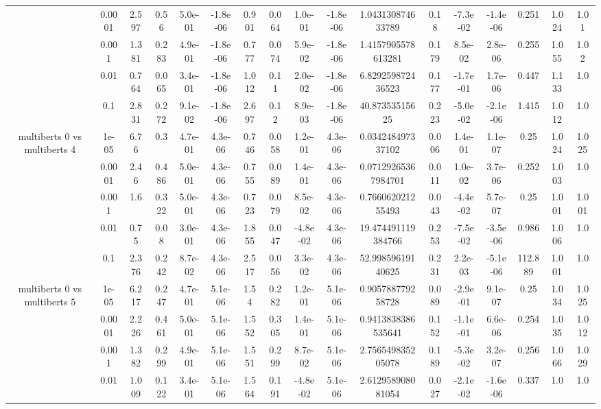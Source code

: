 \begin{tabular}{|c|c|c|c|c|c|c|c|c|c|c|c|c|c|c|c|c|}
 & 0.0001 & 2.597 & 0.56 & 5.0e-01 & -1.8e-06 & 0.901 & 0.064 & 1.0e-01 & -1.8e-06 & 1.043130874633789 & 0.18 & -7.3e-02 & -1.4e-06 & 0.251 & 1.024 & 1.01 \\
 & 0.001 & 1.381 & 0.283 & 4.9e-01 & -1.8e-06 & 0.777 & 0.074 & 5.9e-02 & -1.8e-06 & 1.4157905578613281 & 0.179 & 8.5e-02 & 2.8e-06 & 0.255 & 1.055 & 1.02 \\
 & 0.01 & 0.764 & 0.065 & 3.4e-01 & -1.8e-06 & 1.012 & 0.11 & 2.0e-02 & -1.8e-06 & 6.829259872436523 & 0.177 & -1.7e-01 & 1.7e-06 & 0.447 & 1.133 & 1.0 \\
 & 0.1 & 2.831 & 0.272 & 9.1e-02 & -1.8e-06 & 2.697 & 0.12 & 8.9e-03 & -1.8e-06 & 40.87353515625 & 0.223 & -5.0e-02 & -2.1e-06 & 1.415 & 1.012 & 1.0 \\
\hline
\multirow{5}{*}{multiberts 0 vs multiberts 4} & 1e-05 & 6.76 & 0.3 & 4.7e-01 & 4.3e-06 & 0.746 & 0.058 & 1.2e-01 & 4.3e-06 & 0.034248497337102 & 0.006 & 1.4e-01 & 1.1e-07 & 0.25 & 1.024 & 1.025 \\
 & 0.0001 & 2.46 & 0.486 & 5.0e-01 & 4.3e-06 & 0.755 & 0.089 & 1.4e-01 & 4.3e-06 & 0.07129265367984701 & 0.011 & 1.0e-02 & 3.7e-06 & 0.252 & 1.003 & 1.0 \\
 & 0.001 & 1.6 & 0.322 & 5.0e-01 & 4.3e-06 & 0.723 & 0.079 & 8.5e-02 & 4.3e-06 & 0.766062021255493 & 0.043 & -4.4e-02 & 5.7e-07 & 0.25 & 1.001 & 1.001 \\
 & 0.01 & 0.75 & 0.08 & 3.0e-01 & 4.3e-06 & 1.855 & 0.047 & -4.8e-02 & 4.3e-06 & 19.474491119384766 & 0.253 & -7.5e-02 & -3.5e-06 & 0.986 & 1.006 & 1.0 \\
 & 0.1 & 2.376 & 0.242 & 8.7e-02 & 4.3e-06 & 2.517 & 0.056 & 3.3e-02 & 4.3e-06 & 52.99859619140625 & 0.231 & 2.2e-03 & -5.1e-06 & 112.889 & 1.001 & 1.0 \\
\hline
\multirow{5}{*}{multiberts 0 vs multiberts 5} & 1e-05 & 6.217 & 0.247 & 4.7e-01 & 5.1e-06 & 1.54 & 0.282 & 1.2e-01 & 5.1e-06 & 0.905788779258728 & 0.089 & -2.9e-01 & 9.1e-07 & 0.25 & 1.034 & 1.025 \\
 & 0.0001 & 2.226 & 0.461 & 5.0e-01 & 5.1e-06 & 1.552 & 0.305 & 1.4e-01 & 5.1e-06 & 0.9413838386535641 & 0.152 & -1.1e-01 & 6.6e-06 & 0.254 & 1.035 & 1.012 \\
 & 0.001 & 1.382 & 0.299 & 4.9e-01 & 5.1e-06 & 1.551 & 0.299 & 8.7e-02 & 5.1e-06 & 2.756549835205078 & 0.189 & -5.3e-02 & 3.2e-07 & 0.256 & 1.066 & 1.029 \\
 & 0.01 & 1.009 & 0.122 & 3.4e-01 & 5.1e-06 & 1.564 & 0.191 & -4.8e-02 & 5.1e-06 & 2.612958908081054 & 0.027 & -2.1e-02 & -1.6e-06 & 0.337 & 1.0 & 1.0 \\

\end{tabular}
